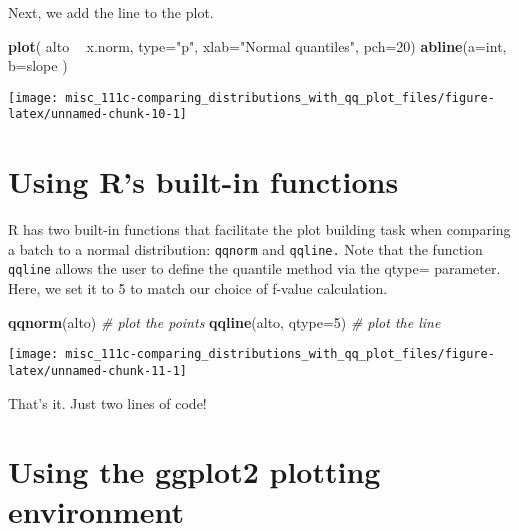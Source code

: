 \documentclass[]{book}
\newenvironment{Shaded}{\begin{snugshade}}{\end{snugshade}}
\newcommand{\CommentTok}[1]{\textcolor[rgb]{0.56,0.35,0.01}{\textit{#1}}}
\newcommand{\DataTypeTok}[1]{\textcolor[rgb]{0.13,0.29,0.53}{#1}}
\newcommand{\DecValTok}[1]{\textcolor[rgb]{0.00,0.00,0.81}{#1}}
\newcommand{\KeywordTok}[1]{\textcolor[rgb]{0.13,0.29,0.53}{\textbf{#1}}}
\newcommand{\NormalTok}[1]{#1}
\newcommand{\OperatorTok}[1]{\textcolor[rgb]{0.81,0.36,0.00}{\textbf{#1}}}
\newcommand{\StringTok}[1]{\textcolor[rgb]{0.31,0.60,0.02}{#1}}
\begin{document}
Next, we add the line to the plot.

\begin{Shaded}
\begin{Highlighting}[]
\KeywordTok{plot}\NormalTok{( alto }\OperatorTok{~}\StringTok{ }\NormalTok{x.norm, }\DataTypeTok{type=}\StringTok{"p"}\NormalTok{, }\DataTypeTok{xlab=}\StringTok{"Normal quantiles"}\NormalTok{, }\DataTypeTok{pch=}\DecValTok{20}\NormalTok{)}
\KeywordTok{abline}\NormalTok{(}\DataTypeTok{a=}\NormalTok{int, }\DataTypeTok{b=}\NormalTok{slope )}
\end{Highlighting}
\end{Shaded}

\begin{center}\texttt{[image: misc\_111c-comparing\_distributions\_with\_qq\_plot\_files/figure-latex/unnamed-chunk-10-1]} \end{center}

\hypertarget{using-rs-built-in-functions}{%
\section{Using R's built-in functions}\label{using-rs-built-in-functions}}

R has two built-in functions that facilitate the plot building task when comparing a batch to a normal distribution: \texttt{qqnorm} and \texttt{qqline.} Note that the function \texttt{qqline} allows the user to define the quantile method via the qtype= parameter. Here, we set it to 5 to match our choice of f-value calculation.

\begin{Shaded}
\begin{Highlighting}[]
\KeywordTok{qqnorm}\NormalTok{(alto)           }\CommentTok{# plot the points}
\KeywordTok{qqline}\NormalTok{(alto, }\DataTypeTok{qtype=}\DecValTok{5}\NormalTok{)  }\CommentTok{# plot the line}
\end{Highlighting}
\end{Shaded}

\begin{center}\texttt{[image: misc\_111c-comparing\_distributions\_with\_qq\_plot\_files/figure-latex/unnamed-chunk-11-1]} \end{center}

That's it. Just two lines of code!

\hypertarget{using-the-ggplot2-plotting-environment}{%
\section{Using the ggplot2 plotting environment}\label{using-the-ggplot2-plotting-environment}}
\end{document}
